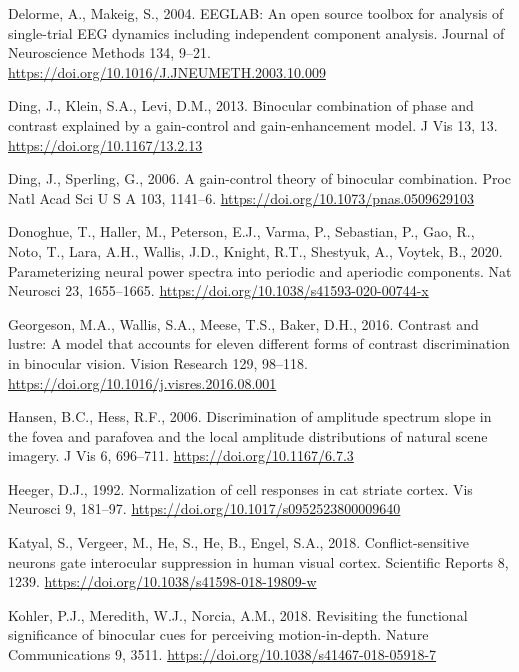 \documentclass[review,
  12pt,
]{elsarticle}
\newlength{\cslhangindent}
\newenvironment{CSLReferences}[2] %
 {\begin{list}{}{%
  \setlength{\itemindent}{0pt}
  \setlength{\leftmargin}{0pt}
  \setlength{\parsep}{0pt}
  \ifodd #1
   \setlength{\leftmargin}{\cslhangindent}
   \setlength{\itemindent}{-1\cslhangindent}
  \fi
  \setlength{\itemsep}{#2\baselineskip}}}
 {\end{list}}
\begin{document}
\begin{CSLReferences}{1}{0}
Delorme, A., Makeig, S., 2004. EEGLAB: An open source toolbox for
analysis of single-trial EEG dynamics including independent component
analysis. Journal of Neuroscience Methods 134, 9--21.
\url{https://doi.org/10.1016/J.JNEUMETH.2003.10.009}

Ding, J., Klein, S.A., Levi, D.M., 2013. Binocular combination of phase
and contrast explained by a gain-control and gain-enhancement model. J
Vis 13, 13. \url{https://doi.org/10.1167/13.2.13}

Ding, J., Sperling, G., 2006. A gain-control theory of binocular
combination. Proc Natl Acad Sci U S A 103, 1141--6.
\url{https://doi.org/10.1073/pnas.0509629103}

Donoghue, T., Haller, M., Peterson, E.J., Varma, P., Sebastian, P., Gao,
R., Noto, T., Lara, A.H., Wallis, J.D., Knight, R.T., Shestyuk, A.,
Voytek, B., 2020. Parameterizing neural power spectra into periodic and
aperiodic components. Nat Neurosci 23, 1655--1665.
\url{https://doi.org/10.1038/s41593-020-00744-x}

Georgeson, M.A., Wallis, S.A., Meese, T.S., Baker, D.H., 2016. Contrast
and lustre: A model that accounts for eleven different forms of contrast
discrimination in binocular vision. Vision Research 129, 98--118.
\url{https://doi.org/10.1016/j.visres.2016.08.001}

Hansen, B.C., Hess, R.F., 2006. Discrimination of amplitude spectrum
slope in the fovea and parafovea and the local amplitude distributions
of natural scene imagery. J Vis 6, 696--711.
\url{https://doi.org/10.1167/6.7.3}

Heeger, D.J., 1992. Normalization of cell responses in cat striate
cortex. Vis Neurosci 9, 181--97.
\url{https://doi.org/10.1017/s0952523800009640}

Katyal, S., Vergeer, M., He, S., He, B., Engel, S.A., 2018.
Conflict-sensitive neurons gate interocular suppression in human visual
cortex. Scientific Reports 8, 1239.
\url{https://doi.org/10.1038/s41598-018-19809-w}

Kohler, P.J., Meredith, W.J., Norcia, A.M., 2018. Revisiting the
functional significance of binocular cues for perceiving
motion-in-depth. Nature Communications 9, 3511.
\url{https://doi.org/10.1038/s41467-018-05918-7}


\end{CSLReferences}
\end{document}
